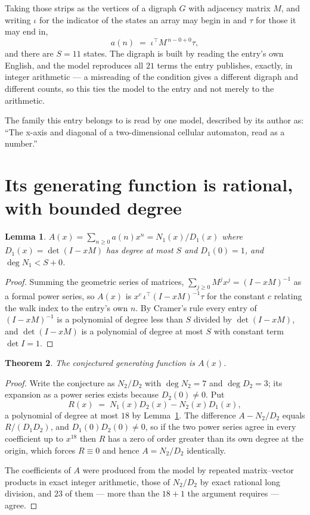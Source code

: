 \documentclass[11pt,a4paper]{article}
\theoremstyle{plain}
\newtheorem{theorem}{Theorem}
\newtheorem{lemma}[theorem]{Lemma}
\theoremstyle{definition}
\begin{document}
Taking those strips as the vertices of a digraph $G$ with adjacency matrix $M$, and writing
$\iota$ for the indicator of the states an array may begin in and $\tau$ for those it may end
in,
\[
a(n)\;=\;\iota^{\!\top}M^{\,n-0+0}\tau ,
\]
and there are $S=11$ states. The digraph is built by reading the entry's own English, and the
model reproduces all $21$ terms the entry publishes, exactly, in integer arithmetic --- a
misreading of the condition gives a different digraph and different counts, so this ties the
model to the entry and not merely to the arithmetic.

The family this entry belongs to is read by one model, described by its author as: ``The x-axis and diagonal of a two-dimensional cellular automaton, read as a number.''


\section{Its generating function is rational, with bounded degree}

\begin{lemma}\label{lem:rat}
$A(x)=\sum_{n\ge0}a(n)x^n=N_1(x)/D_1(x)$ where $D_1(x)=\det(I-xM)$ has degree at most
$S$ and $D_1(0)=1$, and $\deg N_1<S+0$.
\end{lemma}

\begin{proof}
Summing the geometric series of matrices, $\sum_{j\ge0}M^jx^j=(I-xM)^{-1}$ as a formal
power series, so $A(x)$ is $x^{c}\,\iota^{\!\top}(I-xM)^{-1}\tau$ for the constant $c$
relating the walk index to the entry's own $n$. By Cramer's rule every entry of
$(I-xM)^{-1}$ is a polynomial of degree less than $S$ divided by $\det(I-xM)$, and
$\det(I-xM)$ is a polynomial of degree at most $S$ with constant term $\det I=1$.
\end{proof}

\begin{theorem}
The conjectured generating function is $A(x)$.
\end{theorem}

\begin{proof}
Write the conjecture as $N_2/D_2$ with $\deg N_2=7$ and $\deg D_2=3$; its expansion as a
power series exists because $D_2(0)\neq0$. Put
\[
R(x)\;=\;N_1(x)D_2(x)-N_2(x)D_1(x),
\]
a polynomial of degree at most $18$ by Lemma~\ref{lem:rat}. The difference
$A-N_2/D_2$ equals $R/(D_1D_2)$, and $D_1(0)D_2(0)\neq0$, so if the two power series agree in
every coefficient up to $x^{18}$ then $R$ has a zero of order greater than its own
degree at the origin, which forces $R\equiv0$ and hence $A=N_2/D_2$ identically.

The coefficients of $A$ were produced from the model by repeated matrix--vector products in
exact integer arithmetic, those of $N_2/D_2$ by exact rational long division, and $23$
of them --- more than the $18+1$ the argument requires --- agree.
\end{proof}
\end{document}
